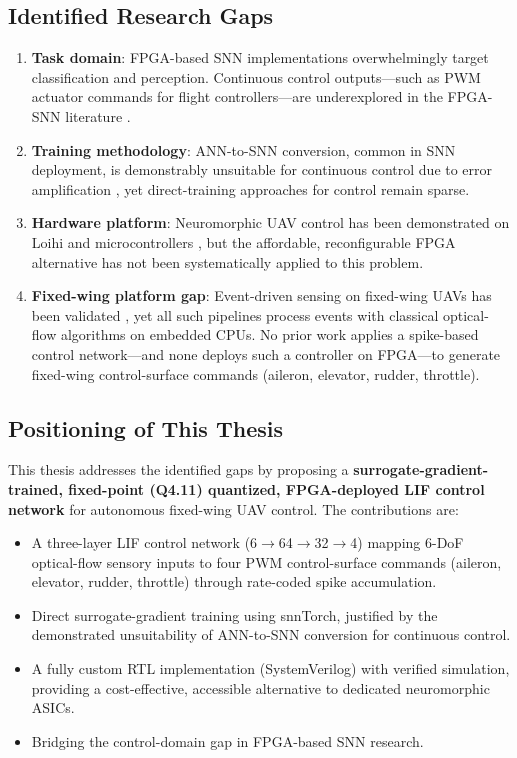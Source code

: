 \documentclass[12pt,a4paper]{article}
\begin{document}
\subsection{Identified Research Gaps}
\begin{enumerate}
    \item \textbf{Task domain}: FPGA-based SNN implementations overwhelmingly target classification and perception. Continuous control outputs---such as PWM actuator commands for flight controllers---are underexplored in the FPGA-SNN literature \cite{Isik2023}.
    \item \textbf{Training methodology}: ANN-to-SNN conversion, common in SNN deployment, is demonstrably unsuitable for continuous control due to error amplification \cite{Xu2026}, yet direct-training approaches for control remain sparse.
    \item \textbf{Hardware platform}: Neuromorphic UAV control has been demonstrated on Loihi and microcontrollers \cite{Paredes2024,Stroobants2025}, but the affordable, reconfigurable FPGA alternative has not been systematically applied to this problem.
    \item \textbf{Fixed-wing platform gap}: Event-driven sensing on fixed-wing UAVs has been validated \cite{Marchei2024,Jeger2026,Coen2026}, yet all such pipelines process events with classical optical-flow algorithms on embedded CPUs. No prior work applies a spike-based control network---and none deploys such a controller on FPGA---to generate fixed-wing control-surface commands (aileron, elevator, rudder, throttle).
\end{enumerate}

\subsection{Positioning of This Thesis}
This thesis addresses the identified gaps by proposing a \textbf{surrogate-gradient-trained, fixed-point (Q4.11) quantized, FPGA-deployed LIF control network} for autonomous fixed-wing UAV control. The contributions are:
\begin{itemize}
    \item A three-layer LIF control network (6$\rightarrow$64$\rightarrow$32$\rightarrow$4) mapping 6-DoF optical-flow sensory inputs to four PWM control-surface commands (aileron, elevator, rudder, throttle) through rate-coded spike accumulation.
    \item Direct surrogate-gradient training using snnTorch, justified by the demonstrated unsuitability of ANN-to-SNN conversion for continuous control.
    \item A fully custom RTL implementation (SystemVerilog) with verified simulation, providing a cost-effective, accessible alternative to dedicated neuromorphic ASICs.
    \item Bridging the control-domain gap in FPGA-based SNN research.
\end{itemize}
\end{document}

